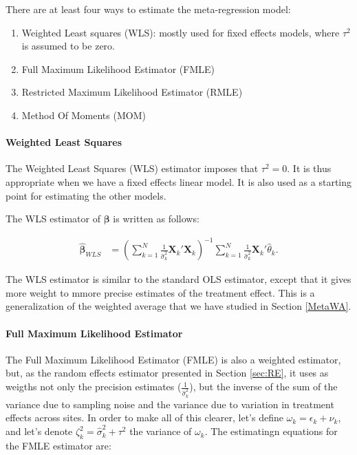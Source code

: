 \documentclass[]{book}
\providecommand{\tightlist}{%
  \setlength{\itemsep}{0pt}\setlength{\parskip}{0pt}}
\let\oldparagraph\paragraph
\renewcommand{\paragraph}[1]{\oldparagraph{#1}\mbox{}}
\theoremstyle{definition}
\theoremstyle{definition}
\theoremstyle{definition}
\theoremstyle{remark}
\begin{document}
There are at least four ways to estimate the meta-regression model:

\begin{enumerate}
\def\labelenumi{\arabic{enumi}.}
\tightlist
\item
  Weighted Least squares (WLS): mostly used for fixed effects models,
  where \(\tau^2\) is assumed to be zero.
\item
  Full Maximum Likelihood Estimator (FMLE)
\item
  Restricted Maximum Likelihood Estimator (RMLE)
\item
  Method Of Moments (MOM)
\end{enumerate}

\paragraph{Weighted Least Squares}\label{weighted-least-squares}

The Weighted Least Squares (WLS) estimator imposes that \(\tau^2=0\). It
is thus appropriate when we have a fixed effects linear model. It is
also used as a starting point for estimating the other models.

The WLS estimator of \(\mathbf{\beta}\) is written as follows:

\begin{align*}
  \mathbf{\hat{\beta}}_{WLS} & = \left(\sum_{k=1}^N\frac{1}{\hat{\sigma}^2_k}\mathbf{X}_k'\mathbf{X}_k\right)^{-1}\sum_{k=1}^N\frac{1}{\hat{\sigma}^2_k}\mathbf{X}_k'\hat{\theta}_k.
\end{align*}

The WLS estimator is similar to the standard OLS estimator, except that
it gives more weight to mmore precise estimates of the treatment effect.
This is a generalization of the weighted average that we have studied in
Section \ref{MetaWA}.

\paragraph{Full Maximum Likelihood
Estimator}\label{full-maximum-likelihood-estimator}

The Full Maximum Likelihood Estimator (FMLE) is also a weighted
estimator, but, as the random effects estimator presented in Section
\ref{sec:RE}, it uses as weigths not only the precision estimates
(\(\frac{1}{\hat{\sigma}^2_k}\)), but the inverse of the sum of the
variance due to sampling noise and the variance due to variation in
treatment effects across sites. In order to make all of this clearer,
let's define \(\omega_k = \epsilon_k + \nu_k\), and let's denote
\(\zeta^2_{k}=\hat{\sigma}^2_k+\tau^2\) the variance of \(\omega_k\).
The estimatingn equations for the FMLE estimator are:
\end{document}
